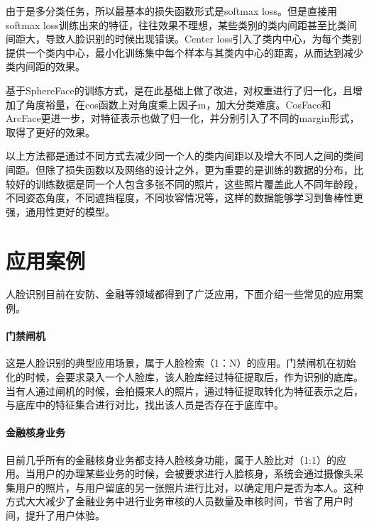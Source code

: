 由于是多分类任务，所以最基本的损失函数形式是softmax loss。但是直接用softmax loss训练出来的特征，往往效果不理想，某些类别的类内间距甚至比类间间距大，导致人脸识别的时候出现错误。Center loss引入了类内中心，为每个类别提供一个类内中心，最小化训练集中每个样本与其类内中心的距离，从而达到减少类内间距的效果。

基于SphereFace的训练方式，是在此基础上做了改进，对权重进行了归一化，且增加了角度裕量，在cos函数上对角度乘上因子m，加大分类难度。CosFace和ArcFace更进一步，对特征表示也做了归一化，并分别引入了不同的margin形式，取得了更好的效果。

以上方法都是通过不同方式去减少同一个人的类内间距以及增大不同人之间的类间间距。但除了损失函数以及网络的设计之外，更为重要的是训练的数据的分布，比较好的训练数据是同一个人包含多张不同的照片，这些照片覆盖此人不同年龄段，不同姿态角度，不同遮挡程度，不同妆容情况等，这样的数据能够学习到鲁棒性更强，通用性更好的模型。
\section{应用案例}

人脸识别目前在安防、金融等领域都得到了广泛应用，下面介绍一些常见的应用案例。
\paragraph{门禁闸机}
这是人脸识别的典型应用场景，属于人脸检索（1：N）的应用。门禁闸机在初始化的时候，会要求录入一个人脸库，该人脸库经过特征提取后，作为识别的底库。当有人通过闸机的时候，会拍摄来人的照片，通过特征提取转化为特征表示之后，与底库中的特征集合进行对比，找出该人员是否存在于底库中。
\paragraph{金融核身业务}
目前几乎所有的金融核身业务都支持人脸核身功能，属于人脸比对（1:1）的应用。当用户的办理某些业务的时候，会被要求进行人脸核身，系统会通过摄像头采集用户的照片，与用户留底的另一张照片进行比对，以确定用户是否为本人。这种方式大大减少了金融业务中进行业务审核的人员数量及审核时间，节省了用户时间，提升了用户体验。
